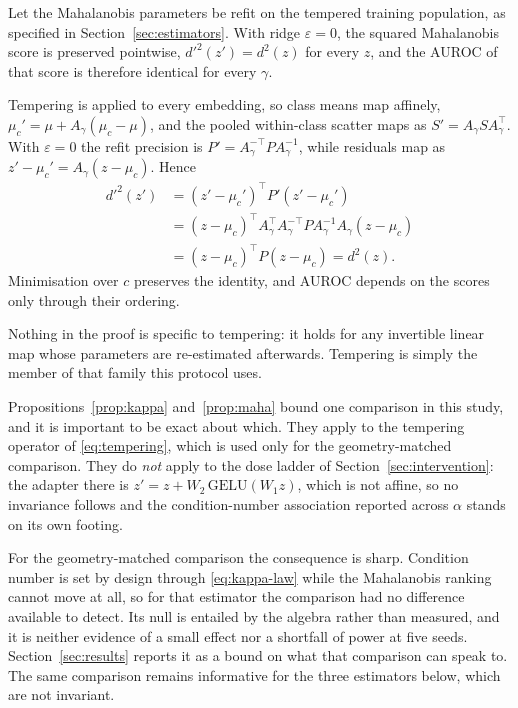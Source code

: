 \begin{proposition}
\label{prop:maha}
Let the Mahalanobis parameters be refit on the tempered training population, as
specified in Section~\ref{sec:estimators}. With ridge $\varepsilon = 0$, the
squared Mahalanobis score is preserved pointwise,
$d'^2(z') = d^2(z)$ for every $z$, and the AUROC of that score is therefore
identical for every $\gamma$.
\end{proposition}

\begin{IEEEproof}
Tempering is applied to every embedding, so class means map affinely,
$\mu_c' = \mu + A_{\gamma}(\mu_c - \mu)$, and the pooled within-class scatter
maps as $S' = A_{\gamma} S A_{\gamma}^{\top}$. With $\varepsilon = 0$ the refit
precision is $P' = A_{\gamma}^{-\top} P A_{\gamma}^{-1}$, while residuals map as
$z' - \mu_c' = A_{\gamma}(z - \mu_c)$. Hence
\begin{align}
  d'^2(z') &= (z' - \mu_c')^{\top} P' (z' - \mu_c') \nonumber\\
           &= (z - \mu_c)^{\top} A_{\gamma}^{\top} A_{\gamma}^{-\top}
              P A_{\gamma}^{-1} A_{\gamma} (z - \mu_c) \nonumber\\
           &= (z - \mu_c)^{\top} P (z - \mu_c) = d^2(z).
\end{align}
Minimisation over $c$ preserves the identity, and AUROC depends on the scores
only through their ordering.
\end{IEEEproof}

Nothing in the proof is specific to tempering: it holds for any invertible
linear map whose parameters are re-estimated afterwards. Tempering is simply
the member of that family this protocol uses.

Propositions~\ref{prop:kappa} and~\ref{prop:maha} bound one comparison in this
study, and it is important to be exact about which. They apply to the tempering
operator of \eqref{eq:tempering}, which is used only for the geometry-matched
comparison. They do \emph{not} apply to the dose ladder of
Section~\ref{sec:intervention}: the adapter there is
$z' = z + W_2\,\mathrm{GELU}(W_1 z)$, which is not affine, so no invariance
follows and the condition-number association reported across $\alpha$ stands on
its own footing.

For the geometry-matched comparison the consequence is sharp. Condition number
is set by design through \eqref{eq:kappa-law} while the Mahalanobis ranking
cannot move at all, so for that estimator the comparison had no difference
available to detect. Its null is entailed by the algebra rather than measured,
and it is neither evidence of a small effect nor a shortfall of power at five
seeds. Section~\ref{sec:results} reports it as a bound on what that comparison
can speak to. The same comparison remains informative for the three estimators
below, which are not invariant.

